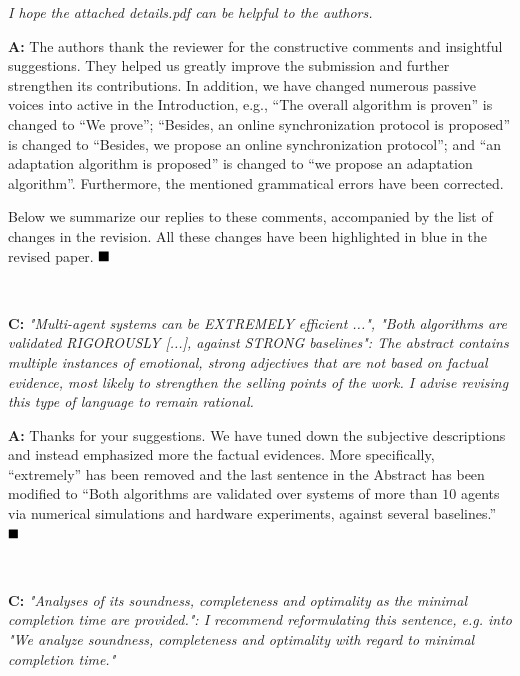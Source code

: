 \documentclass[10pt]{article}
\begin{document}
\emph{
I hope the attached details.pdf can be helpful to the authors.
}



\textbf{A:}
The authors thank the reviewer for the constructive comments and insightful suggestions.
They helped us greatly improve the submission and further strengthen its contributions.
In addition,
we have changed numerous passive voices into active in the Introduction, e.g.,
``The overall algorithm is proven'' is changed to
``We prove'';
``Besides, an online synchronization protocol is proposed''
is changed to
``Besides, we propose an online synchronization protocol'';
and ``an adaptation algorithm is proposed'' is changed to
``we propose an adaptation algorithm''.
Furthermore,
the mentioned grammatical errors have been corrected.

Below we summarize our replies to these comments, accompanied by the list of changes in the revision.
All these changes have been highlighted in blue in the revised paper.
$\hfill\blacksquare$

\hspace*{\fill} \


\textbf{C:}
\emph{ "Multi-agent systems can be EXTREMELY efficient ...", "Both algorithms are validated
	RIGOROUSLY [...], against STRONG baselines": The abstract contains multiple instances of
	emotional, strong adjectives that are not based on factual evidence, most likely to
	strengthen the selling points of the work. I advise revising this type of language to remain
	rational.
}

\textbf{A:} Thanks for your suggestions.
We have tuned down the subjective descriptions and instead emphasized more the factual evidences.
More specifically,
``extremely'' has been removed and the last sentence in the {Abstract} has been modified to
``Both algorithms are validated over systems of more than $10$ agents via numerical simulations and hardware experiments, against several baselines.''
$\hfill\blacksquare$



\hspace*{\fill} \


\textbf{C:}
\emph{"Analyses of its soundness, completeness and optimality as the minimal completion time are
	provided.": I recommend reformulating this sentence, e.g. into "We analyze soundness,
	completeness and optimality with regard to minimal completion time."
}
\end{document}

